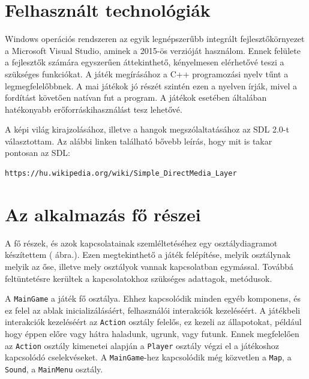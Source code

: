 \label{Chap:komponensek}

\section{Felhasznált technológiák}


Windows operációs rendszeren az egyik legnépszerűbb integrált fejlesztőkörnyezet a Microsoft Visual Studio, aminek a 2015-ös verzióját használom. Ennek felülete a fejlesztők számára egyszerűen áttekinthető, kényelmesen elérhetővé teszi a szükséges funkciókat. A játék megírásához a C++ programozási nyelv tűnt a legmegfelelőbbnek. A mai játékok jó részét szintén ezen a nyelven írják, mivel a fordítást követően natívan fut a program. A játékok esetében általában hatékonyabb erőforráskihasználást tesz lehetővé.

A képi világ kirajzolásához, illetve a hangok megszólaltatásához az SDL 2.0-t választottam. Az alábbi linken található bővebb leírás, hogy mit is takar pontosan az SDL:

\begin{verbatim}
https://hu.wikipedia.org/wiki/Simple_DirectMedia_Layer
\end{verbatim}


\section{Az alkalmazás fő részei}

A fő részek, és azok kapcsolatainak szemléltetéséhez egy osztálydiagramot készítettem ( ábra.). Ezen megtekinthető a játék felépítése, melyik osztálynak melyik az őse, illetve mely osztályok vannak kapcsolatban egymással. Továbbá feltüntetésre kerültek a kapcsolatokhoz szükséges adattagok, metódusok.

A \texttt{MainGame} a játék fő osztálya. Ehhez kapcsolódik minden egyéb komponens, és ez felel az ablak inicializálásáért, felhasználói interakciók kezeléséért. A játékbeli interakciók kezeléséért az \texttt{Action} osztály felelős, ez kezeli az állapotokat, például hogy éppen előre vagy hátra haladunk, ugrunk, vagy futunk. Ennek megfelelően az \texttt{Action} osztály kimenetei alapján a \texttt{Player} osztály végzi el a játékoshoz kapcsolódó cselekvéseket. A \texttt{MainGame}-hez kapcsolódik még közvetlen a \texttt{Map}, a \texttt{Sound}, a \texttt{MainMenu} osztály. 


